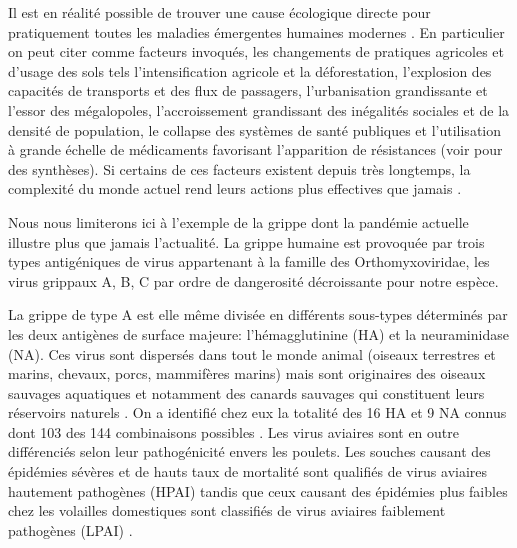 Il est en réalité possible de trouver une cause écologique directe
pour pratiquement toutes les maladies émergentes humaines modernes
\citep{Schrag1995, Morse1995}. En particulier on peut citer comme
facteurs invoqués, les changements de pratiques agricoles et d'usage
des sols tels l'intensification agricole et la déforestation,
l'explosion des capacités de transports et des flux de passagers,
l'urbanisation grandissante et l'essor des mégalopoles,
l'accroissement grandissant des inégalités sociales et de la densité
de population, le collapse des systèmes de santé publiques et
l'utilisation à grande échelle de médicaments favorisant l'apparition
de résistances (voir \citet{Daszak2000, Morens2004, Daszak2004,
  Woolhouse2005, Despommier2006} pour des synthèses). Si certains de
ces facteurs existent depuis très longtemps, la complexité du monde
actuel rend leurs actions plus effectives que jamais
\citep{Morens2008}.

Nous nous limiterons ici à l'exemple de la grippe dont la pandémie
actuelle \citep{Team2009} illustre plus que jamais l'actualité.  La
grippe humaine est provoquée par trois types antigéniques de virus
appartenant à la famille des Orthomyxoviridae, les virus grippaux A,
B, C par ordre de dangerosité décroissante pour notre espèce.

La grippe de type A est elle même divisée en différents sous-types
déterminés par les deux antigènes de surface majeure: l'hémagglutinine
(HA) et la neuraminidase (NA). Ces virus sont dispersés dans tout le
monde animal (oiseaux terrestres et marins, chevaux, porcs, mammifères
marins) mais sont originaires des oiseaux sauvages aquatiques et
notamment des canards sauvages qui constituent leurs réservoirs
naturels \citep{Webster1992}. On a identifié chez eux la totalité des
16 HA et 9 NA connus dont 103 des 144 combinaisons possibles
\citep{Dugan2008}. Les virus aviaires sont en outre différenciés selon
leur pathogénicité envers les poulets. Les souches causant des
épidémies sévères et de hauts taux de mortalité sont qualifiés de
virus aviaires hautement pathogènes (HPAI) tandis que ceux causant des
épidémies plus faibles chez les volailles domestiques sont classifiés
de virus aviaires faiblement pathogènes (LPAI) \citep{Olsen2006}.

